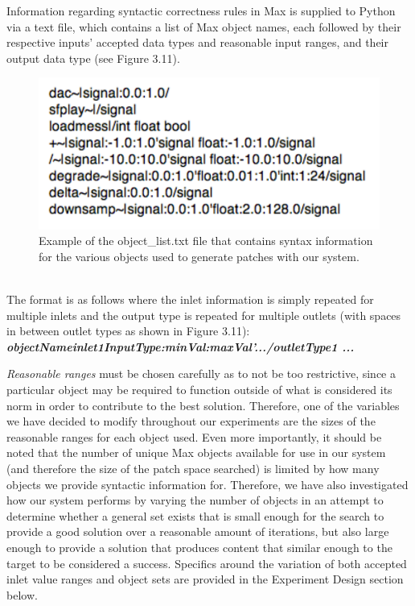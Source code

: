 \documentclass[a4paper,12pt]{report} 	%
\numberwithin{figure}{chapter}
\numberwithin{table}{chapter}
\numberwithin{equation}{chapter}
\begin{document}
\begin{flushleft}
Information regarding syntactic correctness rules in Max is supplied to Python via a text file, which contains a list of Max object names, each followed by their respective inputs' accepted data types and reasonable input ranges, and their output data type (see Figure 3.11).
\begin{figure}[h!]
\begin{center}
\includegraphics[scale=0.8]{SyntaxInfo}
\caption[Object List File]{Example of the object\_list.txt file that contains syntax information for the various objects used to generate patches with our system.}
\end{center}
\end{figure}
\\
The format is as follows where the inlet information is simply repeated for multiple inlets and the output type is repeated for multiple outlets (with spaces in between outlet types as shown in Figure 3.11):
\\
\textbf{\emph{objectName\textbar inlet1InputType:minVal:maxVal'.../outletType1 ...}}

\emph{Reasonable ranges} must be chosen carefully as to not be too restrictive, since a particular object may be required to function outside of what is considered its norm in order to contribute to the best solution. Therefore, one of the variables we have decided to modify throughout our experiments are the sizes of the reasonable ranges for each object used. Even more importantly, it should be noted that the number of unique Max objects available for use in our system (and therefore the size of the patch space searched) is limited by how many objects we provide syntactic information for. Therefore, we have also investigated how our system performs by varying the number of objects in an attempt to determine whether a general set exists that is small enough for the search to provide a good solution over a reasonable amount of iterations, but also large enough to provide a solution that produces content that similar enough to the target to be considered a success. Specifics around the variation of both accepted inlet value ranges and object sets are provided in the Experiment Design section below.


\end{flushleft}
\end{document}
